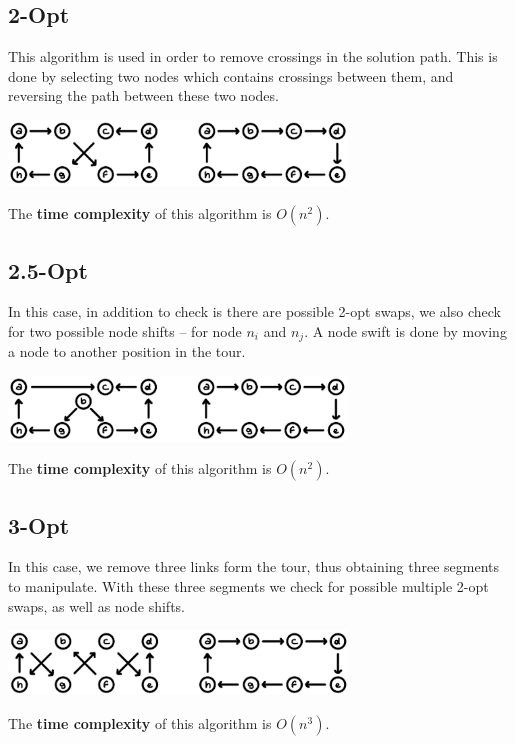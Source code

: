 \documentclass{article}
\begin{document}
\subsection{2-Opt}
This algorithm is used in order to remove crossings in the solution path. This is done by selecting two nodes which contains crossings between them, and reversing the path between these two nodes. \\

\begin{center}
	\includegraphics[width=9cm]{2opt.png}
\end{center}
\vspace{.3cm}
The \textbf{time complexity} of this algorithm is $O(n^2)$.

\subsection{2.5-Opt}
In this case, in addition to check is there are possible 2-opt swaps, we also check for two possible node shifts -- for node $n_i$ and $n_j$. A node swift is done by moving a node to another position in the tour. \\

\begin{center}
	\includegraphics[width=9cm]{2.5opt.png}
\end{center}
\vspace{.3cm}
The \textbf{time complexity} of this algorithm is $O(n^2)$.

\subsection{3-Opt}
In this case, we remove three links form the tour, thus obtaining three segments to manipulate. With these three segments we check for possible multiple 2-opt swaps, as well as node shifts. \\

\begin{center}
	\includegraphics[width=9cm]{3opt.png}
\end{center}
\vspace{.3cm}
The \textbf{time complexity} of this algorithm is $O(n^3)$.
\end{document}
